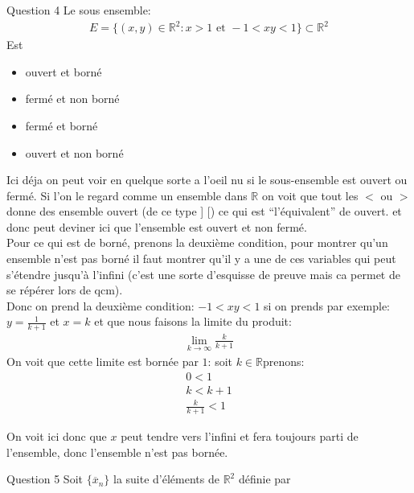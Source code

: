 \begin{parag}{Question 4}
    Le sous ensemble:
    \begin{align*} E = \{ \left(x, y\right) \in \mathbb{R}^2: x > 1 \text{ et } -1 < xy < 1\} \subset \mathbb{R}^2 \end{align*}
    Est 
    \begin{itemize}
        \item ouvert et borné
        \item fermé et non borné
        \item fermé et borné
        \item ouvert et non borné
    \end{itemize}
    Ici déja on peut voir en quelque sorte a l'oeil nu si le sous-ensemble est ouvert ou fermé. Si l'on le regard comme un ensemble dans $\mathbb{R}$ on voit que tout les $<$ ou $>$ donne des ensemble ouvert (de ce type ] [) ce qui est ``l'équivalent'' de ouvert. et donc peut deviner ici que l'ensemble est ouvert et non fermé.\\
    Pour ce qui est de borné, prenons la deuxième condition, pour montrer qu'un ensemble n'est pas borné il faut montrer qu'il y a une de ces variables qui peut s'étendre jusqu'à l'infini (c'est une sorte d'esquisse de preuve mais ca permet de se répérer lors de qcm).\\
    Donc on prend la deuxième condition: $-1 < xy < 1$ si on prends par exemple: $y = \frac{1}{k + 1}$ et $x = k$ et que nous faisons la limite du produit:
    \begin{align*} \lim_{k \to \infty} \frac{k}{k+1} \end{align*}
    On voit que cette limite est bornée par $1$: soit $k \in \mathbb{R}$prenons:
    \begin{align*} 0 < 1\\
k < k + 1\\
\frac{k}{k+1} < 1
    \end{align*}

    On voit ici donc que $x$ peut tendre vers l'infini et fera toujours parti de l'ensemble, donc l'ensemble n'est pas bornée.

    
    
\end{parag}
\begin{parag}{Question 5}
    Soit $\{\overline{x}_n\}$ la suite d'éléments de $\mathbb{R}^2$ définie par
\end{parag}




